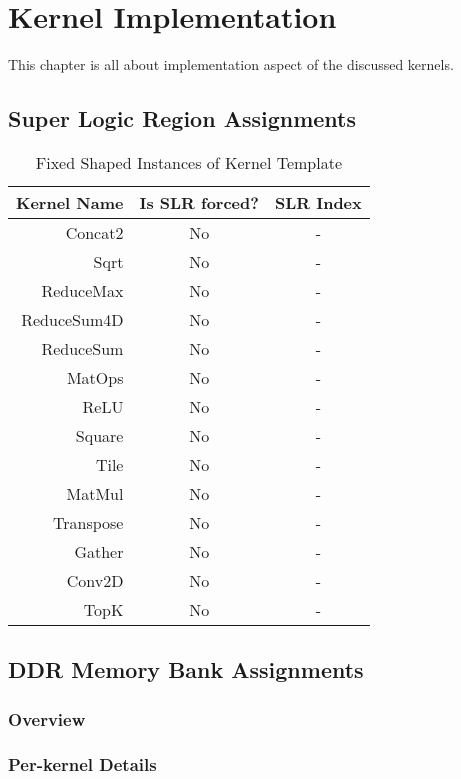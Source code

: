 \chapter{Kernel Implementation}
This chapter is all about implementation aspect of the discussed kernels.

\section{Super Logic Region Assignments}
\begin{table}[htbp] %
\caption{Fixed Shaped Instances of Kernel Template}
\label{tab:shapes_concat}
	\begin{center}
		\begin{tabular}{|r|c|c|} 
		\hline	
		Kernel Name & Is SLR forced? & SLR Index\\ 
		\hline	
		Concat2 & No & -\\ 
		\hline		
		Sqrt & No & -\\ 
		\hline		
		ReduceMax & No & -\\ 
		\hline		
		ReduceSum4D & No & -\\ 
		\hline		
		ReduceSum & No & -\\ 
		\hline		
		MatOps & No & -\\ 
		\hline		
		ReLU & No & -\\ 
		\hline		
		Square & No & -\\ 
		\hline		
		Tile & No & -\\ 
		\hline			
		MatMul & No & -\\ 
		\hline			
		Transpose & No & -\\ 
		\hline			
		Gather & No & -\\ 
		\hline			
		Conv2D & No & -\\ 
		\hline			
		TopK & No & -\\ 
		\hline		
		\end{tabular}
	\end{center}
\end{table}




\section{DDR Memory Bank Assignments}
\subsection{Overview}
\subsection{Per-kernel Details}
